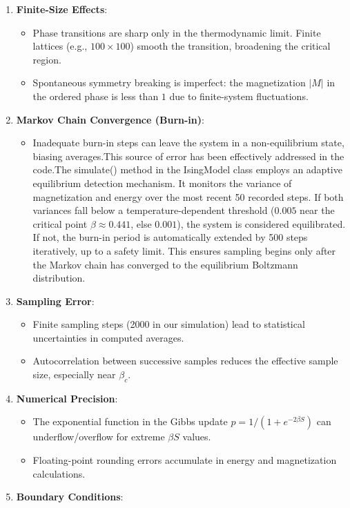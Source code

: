 \documentclass[11pt]{article}
\providecommand{\tightlist}{%
      \setlength{\itemsep}{0pt}\setlength{\parskip}{0pt}}
\begin{document}
\begin{enumerate}
\def\labelenumi{\arabic{enumi}.}
\item
  \textbf{Finite-Size Effects}:

  \begin{itemize}
  \tightlist
  \item
    Phase transitions are sharp only in the thermodynamic limit. Finite
    lattices (e.g., \(100\times100\)) smooth the transition, broadening
    the critical region.
  \item
    Spontaneous symmetry breaking is imperfect: the magnetization
    \(|M|\) in the ordered phase is less than \(1\) due to finite-system
    fluctuations.
  \end{itemize}
\item
  \textbf{Markov Chain Convergence (Burn-in)}:

  \begin{itemize}
  \tightlist
  \item
    Inadequate burn-in steps can leave the system in a non-equilibrium
    state, biasing averages.This source of error has been effectively
    addressed in the code.The simulate() method in the IsingModel class
    employs an adaptive equilibrium detection mechanism. It monitors the
    variance of magnetization and energy over the most recent 50
    recorded steps. If both variances fall below a temperature-dependent
    threshold (\(0.005\) near the critical point \(\beta\approx 0.441\),
    else \(0.001\)), the system is considered equilibrated. If not, the
    burn-in period is automatically extended by 500 steps iteratively,
    up to a safety limit. This ensures sampling begins only after the
    Markov chain has converged to the equilibrium Boltzmann
    distribution.
  \end{itemize}
\item
  \textbf{Sampling Error}:

  \begin{itemize}
  \tightlist
  \item
    Finite sampling steps (2000 in our simulation) lead to statistical
    uncertainties in computed averages.
  \item
    Autocorrelation between successive samples reduces the effective
    sample size, especially near \(\beta_c\).
  \end{itemize}
\item
  \textbf{Numerical Precision}:

  \begin{itemize}
  \tightlist
  \item
    The exponential function in the Gibbs update
    \(p=1/(1+e^{-2\beta S})\) can underflow/overflow for extreme
    \(\beta S\) values.
  \item
    Floating-point rounding errors accumulate in energy and
    magnetization calculations.
  \end{itemize}
\item
  \textbf{Boundary Conditions}:


\end{enumerate}
\end{document}
